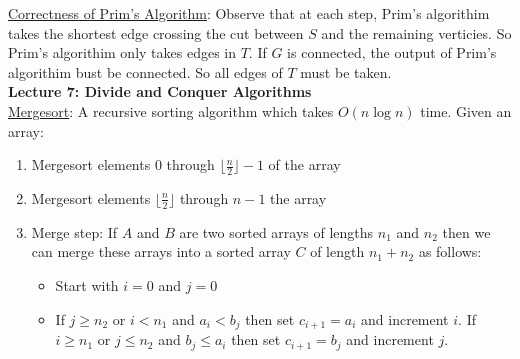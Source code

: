 \documentclass{article}
\begin{document}
\underline{Correctness of Prim's Algorithm}: Observe that at each step, Prim's algorithim takes the shortest edge crossing the cut between $S$ and the remaining verticies. So Prim's algorithim only takes edges in $T$. If $G$ is connected, the output of Prim's algorithim bust be connected. So all edges of $T$ must be taken. \\[1.0ex]
\textbf{Lecture 7: Divide and Conquer Algorithms} \\[1.0ex]
\underline{Mergesort}: A recursive sorting algorithm which takes $O(n \log n)$ time. Given an array:
\begin{enumerate}
    \item Mergesort elements 0 through $\lfloor \frac{n}{2} \rfloor - 1$ of the array
    \item Mergesort elements $\lfloor \frac{n}{2} \rfloor$ through $n - 1$ the array
    \item Merge step: If $A$ and $B$ are two sorted arrays of lengths $n_1$ and $n_2$ then we can merge these arrays into a sorted array $C$ of length $n_1 + n_2$ as follows:
    \begin{itemize}
        \item Start with $i = 0$ and $j = 0$
        \item If $j \geq n_2$ or $i < n_1$ and $a_i < b_j$ then set $c_{i + 1} = a_i$ and increment $i$. If $i \geq n_1$ or $j \leq n_2$ and $b_j \leq a_i$ then set $c_{i + 1} = b_j$ and increment $j$.
    \end{itemize}
\end{enumerate}
\end{document}
